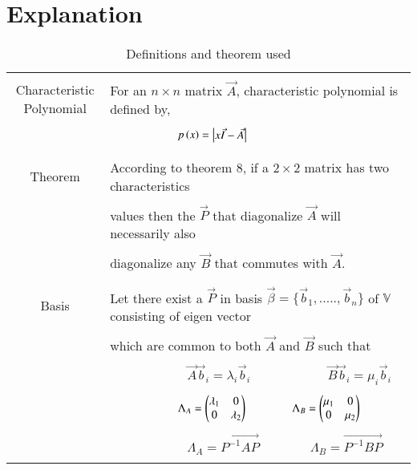 \documentclass[journal,12pt]{IEEEtran}
\begin{document}
\section{\textbf{Explanation}}
\renewcommand{\thetable}{1}
\begin{table}[ht!]
\centering
\begin{tabular}{|c|l|}
\hline
\multirow{3}{*}{Characteristic Polynomial} 
     & \\
     & For an $n\times n$ matrix $\vec{A}$, characteristic polynomial
     is defined by,\\
     &\\
     & $\qquad\qquad\qquad p\left(x\right)=\begin{vmatrix}x\Vec{I}-\Vec{A}\end{vmatrix}$\\
     &\\
\hline
\multirow{3}{*}{Theorem}
     &\\
     & According  to theorem 8, if a $2\times 2$ matrix has two 
     characteristics \\
     &\\
     & values then the $\vec{P}$ that diagonalize $\vec{A}$ will
     necessarily also   \\
     &\\
     & diagonalize any $\vec{B}$ that commutes with $\vec{A}$. \\
     &\\
\hline
\multirow{3}{*}{Basis}&\\
     & Let there exist a $\vec{P}$ in basis
     $\vec{\beta}=\{\vec{b}_1,.....,\vec{b}_n\}$ of $\mathbb{V}$  
     consisting of eigen vector\\
     &\\
     & which are common to both $\vec{A}$ and $\vec{B}$ such that\\
     &\\
     & $\qquad\qquad\qquad\vec{A}\vec{b}_i=\lambda_{i}\vec{b}_i
     \qquad\qquad\qquad\vec{B}\vec{b}_i=\mu_{i}\vec{b}_i$\\
     &\\
     & $\qquad\qquad\qquad\Lambda_{A}=\begin{pmatrix}\lambda_1&0\\0&\lambda
     _2\end{pmatrix}\qquad\qquad\Lambda_{B}=\begin{pmatrix}\mu_1&0\\0&\mu_2\end{pmatrix}$\\
     &\\
     & $\qquad\qquad\qquad\Lambda_{A}=\vec{P^{-1}AP} 
     \qquad\qquad\Lambda_{B}=\vec{P^{-1}BP}$\\
     &\\
\hline
\end{tabular}
\label{table:1}
\caption{Definitions and theorem used}
\end{table}
\newpage
\end{document}
